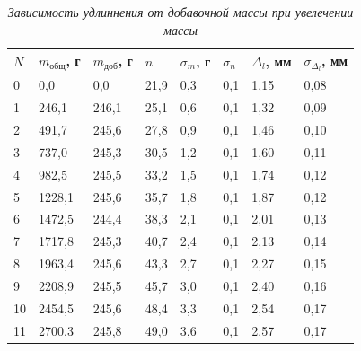\documentclass[a4paper,12pt]{article}
\begin{document}
\begin{table}[!ht]
    \centering
    \begin{tabular}{|l|l|l|l|l|l|l|l|}
    \hline
        $N$ & $m_\text{общ}$, г & $m_\text{доб}$, г & $n$ & $\sigma_m$, г & $\sigma_n$ & $\Delta_l$, мм & $\sigma_{\Delta_l}$, мм \\ \hline
        0 & 0,0 & 0,0 & 21,9 & 0,3 & 0,1 & 1,15 & 0,08 \\ \hline
        1 & 246,1 & 246,1 & 25,1 & 0,6 & 0,1 & 1,32 & 0,09 \\ \hline
        2 & 491,7 & 245,6 & 27,8 & 0,9 & 0,1 & 1,46 & 0,10 \\ \hline
        3 & 737,0 & 245,3 & 30,5 & 1,2 & 0,1 & 1,60 & 0,11 \\ \hline
        4 & 982,5 & 245,5 & 33,2 & 1,5 & 0,1 & 1,74 & 0,12 \\ \hline
        5 & 1228,1 & 245,6 & 35,7 & 1,8 & 0,1 & 1,87 & 0,12 \\ \hline
        6 & 1472,5 & 244,4 & 38,3 & 2,1 & 0,1 & 2,01 & 0,13 \\ \hline
        7 & 1717,8 & 245,3 & 40,7 & 2,4 & 0,1 & 2,13 & 0,14 \\ \hline
        8 & 1963,4 & 245,6 & 43,3 & 2,7 & 0,1 & 2,27 & 0,15 \\ \hline
        9 & 2208,9 & 245,5 & 45,7 & 3,0 & 0,1 & 2,40 & 0,16 \\ \hline
        10 & 2454,5 & 245,6 & 48,4 & 3,3 & 0,1 & 2,54 & 0,17 \\ \hline
        11 & 2700,3 & 245,8 & 49,0 & 3,6 & 0,1 & 2,57 & 0,17 \\ \hline
    \end{tabular}\caption{\textit{Зависимость удлиннения от добавочной массы при увелечении массы}}\label{udlin-uvel}
\end{table}
\end{document}
